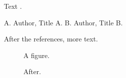 \documentclass{bibrefs}
\begin{document}
Text \cite{a}.
\begin{references}
 A. Author, Title A.
 B. Author, Title B.
\end{references}
After the references, more text.
\begin{figure}[h]\centering A figure.\caption{After.}\end{figure}
\end{document}
